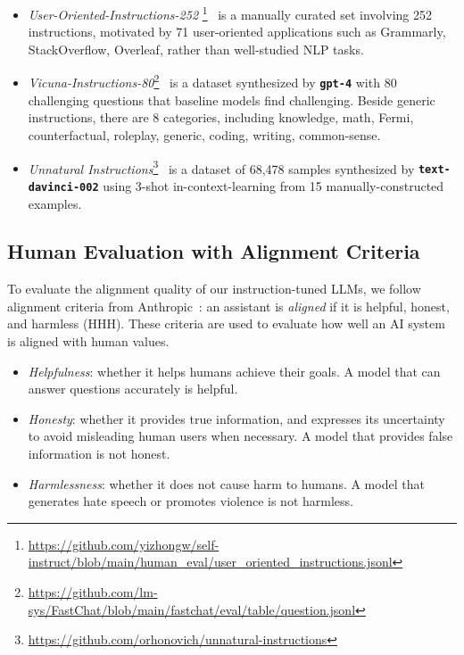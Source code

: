 \begin{itemize}[leftmargin=7.5mm]

\item 
{\it User-Oriented-Instructions-252}
\footnote{\tiny \url{https://github.com/yizhongw/self-instruct/blob/main/human_eval/user_oriented_instructions.jsonl}}~\citep{wang2022self} 
is a manually curated set involving 252 instructions, motivated by 71 user-oriented applications such as Grammarly, StackOverflow, Overleaf, rather than well-studied NLP tasks.
\item 
{\it Vicuna-Instructions-80}\footnote{\tiny \url{https://github.com/lm-sys/FastChat/blob/main/fastchat/eval/table/question.jsonl}}~\citep{vicuna}
is a dataset synthesized by \texttt{\bfseries gpt-4} with 80 challenging questions that baseline models find challenging. Beside generic instructions, there are 8 categories, including knowledge, math, Fermi, counterfactual, roleplay, generic, coding, writing, common-sense.
\item 
{\it Unnatural Instructions}\footnote{\tiny \url{https://github.com/orhonovich/unnatural-instructions}}~\citep{honovich2022unnatural}
is a dataset of 68,478 samples synthesized by \texttt{\bfseries text-davinci-002} using 3-shot in-context-learning from 15 manually-constructed examples.

\end{itemize}

\subsection{Human Evaluation with Alignment Criteria}

To evaluate the alignment quality of our instruction-tuned LLMs, we follow alignment criteria from Anthropic~\citet{askell2021general}: an assistant is {\it aligned} if it is helpful, honest, and harmless (HHH). These criteria are used to evaluate how well an AI system is aligned with human values.

\begin{itemize}[leftmargin=7.5mm]

\item 
{\it Helpfulness}: whether it helps humans achieve their goals. A model that can answer questions accurately is helpful.
\item
{\it Honesty}: whether it provides true information, and expresses its uncertainty to avoid misleading human users when necessary. A model that provides false information is not honest.
\item
{\it Harmlessness}: whether it does not cause harm to humans. A model that generates hate speech or promotes violence is not harmless.
\end{itemize}

